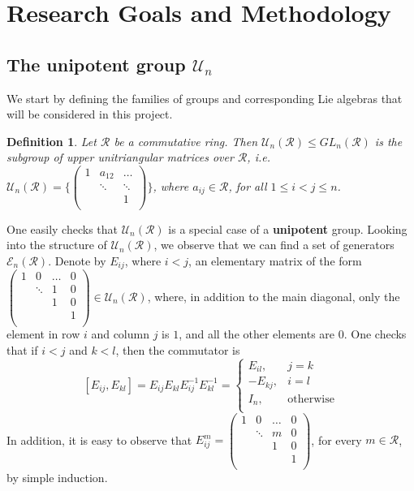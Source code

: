 \documentclass[12pt]{article}
\newtheorem{definition}[theorem]{Definition}
\begin{document}
\section{Research Goals and Methodology}
\subsection{The unipotent group $\mathcal{U}_n$}
We start by defining the families of groups and corresponding Lie algebras that will be considered in this project.
\begin{definition}
\label{def.unipotent.matrix}
Let $\mathcal{R}$ be a commutative ring. Then $\mathcal{U}_n(\mathcal{R})\leq GL_n(\mathcal{R})$ is the subgroup of upper unitriangular matrices over $\mathcal{R}$, i.e. $\mathcal{U}_n(\mathcal{R})=\Bigg\{
\begin{pmatrix}
1 & a_{12} &\dots\\
  & \ddots & \ddots\\
  & & 1\\
\end{pmatrix}\Bigg\}$, where $a_{ij}\in\mathcal{R}$, for all $1\leq i<j\leq n$.
\end{definition}
 One easily checks that $\mathcal{U}_n(\mathcal{R})$ is a special case of a \textbf{unipotent} group.
Looking into the structure of $\mathcal{U}_n(\mathcal{R})$, we observe that we can find a set of generators $\mathcal{E}_n(\mathcal{R})$. Denote by $E_{ij}$, where $i<j$, an elementary matrix of the form $\begin{pmatrix}
1 & 0 & \dots & 0\\
  & \ddots & 1 & 0\\
  &  & 1 & 0\\
  & & & 1\\
  \end{pmatrix}\in \mathcal{U}_n(\mathcal{R})$, where, in addition to the main diagonal, only the element in row $i$ and column $j$ is $1$, and all the other elements are $0$. One checks that if $i<j$ and $k<l$, then the commutator is \[
  [E_{ij},E_{kl}]=E_{ij}E_{kl}E_{ij}^{-1}E_{kl}^{-1}=\begin{cases}
    E_{il}, & j=k\\
    -E_{kj}, & {i=l}\\
    I_n, & \text{otherwise}\\
    \end{cases}
    \]
  In addition, it is easy to observe that $E_{ij}^m=\begin{pmatrix}
1 & 0 & \dots & 0\\
  & \ddots & m & 0\\
  &  & 1 & 0\\
  & & & 1\\
  \end{pmatrix}$, for every $m\in\mathcal{R}$, by simple induction.
\end{document}
